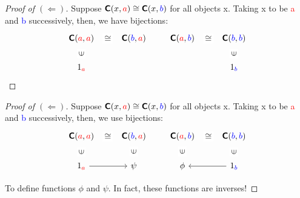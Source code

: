 \documentclass[tikz]{beamer}
\newcommand{\cat}[1]{\bm{ \mathsf{#1} }}
\newcommand{\cc}{\cat{C}}
\newcommand{\red}[1]{\textcolor{red}{#1}}
\newcommand{\blue}[1]{\textcolor{blue}{#1}}
\theoremstyle{definition}
\begin{document}
\begin{frame}[fragile]

	\begin{proof}[Proof of $(\Leftarrow)$]
		Suppose $\cc(x, \red{a}) \cong \cc(x, \blue{b})$ for all objects x. Taking x to be \red{a} and \blue{b} successively, then, we have bijections: 
		\[
		\begin{aligned}
			\begin{tikzcd}[
  ar symbol/.style = {draw=none,"\textstyle#1" description,sloped},
  isomorphic/.style = {ar symbol={\cong}},
  inhabits/.style = {ar symbol={\in}}
  ]
				\cc(\red{a}, \red{a}) \ar[r, isomorphic] & \cc(\blue{b}, \red{a}) 
				\\ 1_{\red{a}}  \ar[u, inhabits]
			\end{tikzcd}
			\qquad
			\begin{tikzcd}[
  ar symbol/.style = {draw=none,"\textstyle#1" description,sloped},
  isomorphic/.style = {ar symbol={\cong}},
    inhabits/.style = {ar symbol={\in}}
  ]
				\cc(\red{a}, \blue{b}) \ar[r, isomorphic] & \cc(\blue{b}, \blue{b})
				\\ & 1_{\blue{b}} \ar[u, inhabits]
			\end{tikzcd}
		\end{aligned}
		\]
		
	\end{proof}
\end{frame}

\begin{frame}[fragile]

	\begin{proof}[Proof of $(\Leftarrow)$]
		Suppose $\cc(x, \red{a}) \cong \cc(x, \blue{b})$ for all objects x. Taking x to be \red{a} and \blue{b} successively, then, we use bijections: 
		\[
		\begin{aligned}
			\begin{tikzcd}[
  ar symbol/.style = {draw=none,"\textstyle#1" description,sloped},
  isomorphic/.style = {ar symbol={\cong}},
  inhabits/.style = {ar symbol={\in}}
  ]
				\cc(\red{a}, \red{a}) \ar[r, isomorphic] & \cc(\blue{b}, \red{a}) 
				\\ 1_{\red{a}}  \ar[u, inhabits] \ar[r] & \psi \ar[u, inhabits]
			\end{tikzcd}
			\qquad
			\begin{tikzcd}[
  ar symbol/.style = {draw=none,"\textstyle#1" description,sloped},
  isomorphic/.style = {ar symbol={\cong}},
    inhabits/.style = {ar symbol={\in}}
  ]
				\cc(\red{a}, \blue{b}) \ar[r, isomorphic] & \cc(\blue{b}, \blue{b})
				\\  \phi \ar[u, inhabits] & 1_{\blue{b}} \ar[u, inhabits]  \ar[l]
			\end{tikzcd}
		\end{aligned}
		\]
		
	To define functions $\phi$ and $\psi$. In fact, these functions are inverses!
	\end{proof}
\end{frame}
\end{document}
